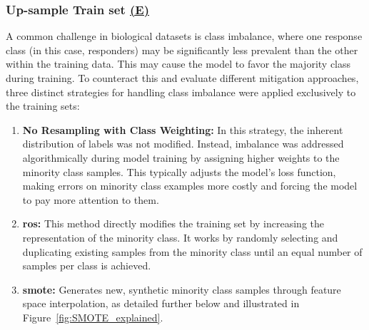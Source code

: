 \documentclass[12pt,a4paper]{report}
\begin{document}
\subsubsection*{Up-sample Train set \hyperref[fig:pipeline-1]{(E)}}
\label{subsubsec:up-sample_train_set}
A common challenge in biological datasets is class imbalance, where one response class (in this case, responders) may be significantly less prevalent than the other within the training data. This may cause the model to favor the majority class during training. To counteract this and evaluate different mitigation approaches, three distinct strategies for handling class imbalance were applied exclusively to the training sets:

\begin{enumerate}
    \item \textbf{No Resampling with Class Weighting:} In this strategy, the inherent distribution of labels  was not modified. Instead, imbalance was addressed algorithmically during model training by assigning higher weights to the minority class samples. This typically adjusts the model's loss function, making errors on minority class examples more costly and forcing the model to pay more attention to them.
    \item \textbf{\gls{ros}:} This method directly modifies the training set by increasing the representation of the minority class. It works by randomly selecting and duplicating existing samples from the minority class until an equal number of samples per class is achieved.
    \item \textbf{\acrfull{smote}:} Generates new, synthetic minority class samples through feature space interpolation, as detailed further below and illustrated in Figure~\ref{fig:SMOTE_explained}.
\end{enumerate}
\end{document}
